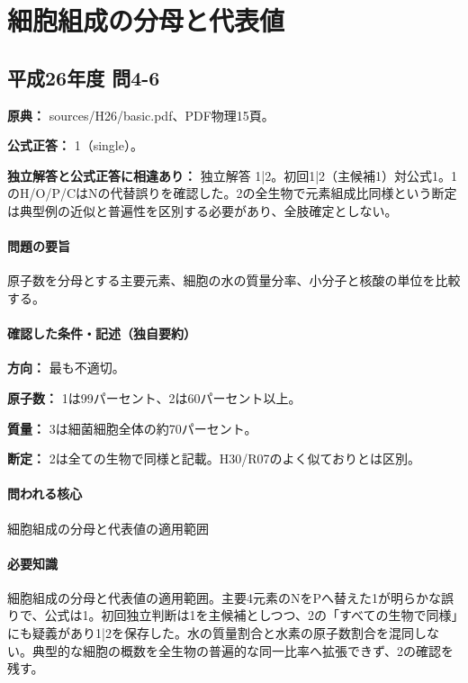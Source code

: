 \section{細胞組成の分母と代表値}

\subsection{平成26年度 問4-6}
\label{q:h26-reg-basic-4-6}

\noindent\textbf{原典：} sources/H26/basic.pdf、PDF物理15頁。

\textbf{公式正答：} 1（single）。

\par\textbf{独立解答と公式正答に相違あり：} 独立解答 1|2。初回1|2（主候補1）対公式1。1のH/O/P/CはNの代替誤りを確認した。2の全生物で元素組成比同様という断定は典型例の近似と普遍性を区別する必要があり、全肢確定としない。

\paragraph{問題の要旨} 原子数を分母とする主要元素、細胞の水の質量分率、小分子と核酸の単位を比較する。

\paragraph{確認した条件・記述（独自要約）}\mbox{}\par

\noindent\textbf{方向：} 最も不適切。\par

\noindent\textbf{原子数：} 1は99パーセント、2は60パーセント以上。\par

\noindent\textbf{質量：} 3は細菌細胞全体の約70パーセント。\par

\noindent\textbf{断定：} 2は全ての生物で同様と記載。H30/R07のよく似ておりとは区別。\par

\paragraph{問われる核心} 細胞組成の分母と代表値の適用範囲

\paragraph{必要知識} 細胞組成の分母と代表値の適用範囲。主要4元素のNをPへ替えた1が明らかな誤りで、公式は1。初回独立判断は1を主候補としつつ、2の「すべての生物で同様」にも疑義があり1|2を保存した。水の質量割合と水素の原子数割合を混同しない。典型的な細胞の概数を全生物の普遍的な同一比率へ拡張できず、2の確認を残す。

